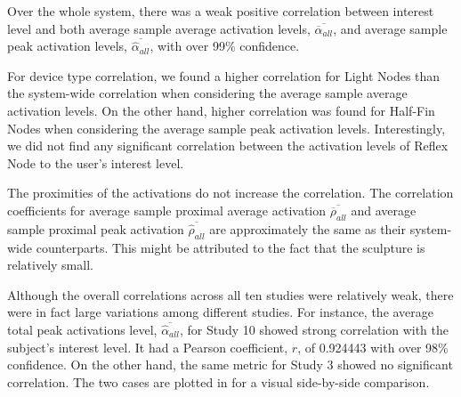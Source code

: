 Over the whole system, there was a weak positive correlation between interest level and both average sample average activation levels, $\overline{\overline{\alpha}_{all}}$, and average sample peak activation levels, $\overline{\widehat{\alpha}_{all}}$, with over 99\% confidence.

For device type correlation, we found a higher correlation for Light Nodes than the system-wide correlation when considering the average sample average activation levels. On the other hand, higher correlation was found for Half-Fin Nodes when considering the average sample peak activation levels. Interestingly, we did not find any significant correlation between the activation levels of Reflex Node to the user's interest level. 

The proximities of the activations do not increase the correlation. The correlation coefficients for average sample proximal average activation $\overline{\overline{\rho}_{all}}$ and average sample proximal peak activation $\overline{\widehat{\rho}_{all}}$ are approximately the same as their system-wide counterparts. This might be attributed to the fact that the sculpture is relatively small. 

Although the overall correlations across all ten studies were relatively weak, there were in fact large variations among different studies. For instance, the average total peak activations level, $\overline{\widehat{\alpha}_{all}}$, for Study 10 showed strong correlation with the subject's interest level. It had a Pearson coefficient, $r$, of 0.924443 with over 98\% confidence. On the other hand, the same metric for Study 3 showed no significant correlation. The two cases are plotted in  for a visual side-by-side comparison.


